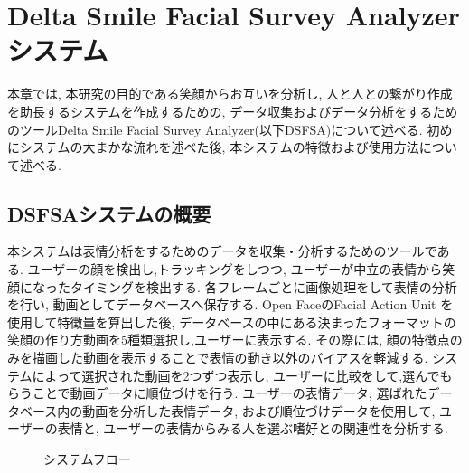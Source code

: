 \chapter{Delta Smile Facial Survey Analyzerシステム}
\label{chap:aboutDSFSA}

本章では, 本研究の目的である笑顔からお互いを分析し, 人と人との繋がり作成を助長するシステムを作成するための,
データ収集およびデータ分析をするためのツールDelta Smile Facial Survey Analyzer(以下DSFSA)について述べる.
初めにシステムの大まかな流れを述べた後, 本システムの特徴および使用方法について述べる.


\section{DSFSAシステムの概要}
本システムは表情分析をするためのデータを収集・分析するためのツールである.
ユーザーの顔を検出し,トラッキングをしつつ,
ユーザーが中立の表情から笑顔になったタイミングを検出する.
各フレームごとに画像処理をして表情の分析を行い, 動画としてデータベースへ保存する.
Open FaceのFacial Action Unit を使用して特徴量を算出した後,
データベースの中にある決まったフォーマットの笑顔の作り方動画を5種類選択し,ユーザーに表示する.
その際には, 顔の特徴点のみを描画した動画を表示することで表情の動き以外のバイアスを軽減する.
システムによって選択された動画を2つずつ表示し, ユーザーに比較をして,選んでもらうことで動画データに順位づけを行う.
ユーザーの表情データ, 選ばれたデータベース内の動画を分析した表情データ, および順位づけデータを使用して,
ユーザーの表情と, ユーザーの表情からみる人を選ぶ嗜好との関連性を分析する.

\begin{figure}[htbp]
    \begin{center}
    \end{center}
    \caption{システムフロー}
    \label{fig:system_architecture}
\end{figure}



